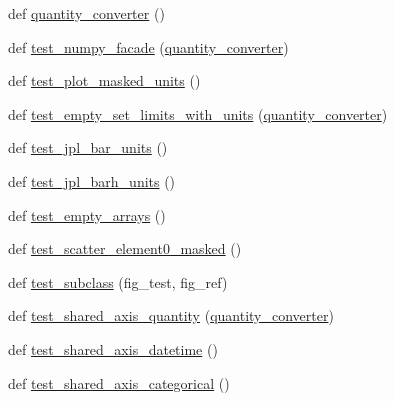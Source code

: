 \begin{DoxyCompactItemize}
\item 
def \hyperlink{namespacematplotlib_1_1tests_1_1test__units_a1844431c1fa8ffb8430bb34273ad40ff}{quantity\+\_\+converter} ()
\item 
def \hyperlink{namespacematplotlib_1_1tests_1_1test__units_ab53242bbae480923142ed100236415f3}{test\+\_\+numpy\+\_\+facade} (\hyperlink{namespacematplotlib_1_1tests_1_1test__units_a1844431c1fa8ffb8430bb34273ad40ff}{quantity\+\_\+converter})
\item 
def \hyperlink{namespacematplotlib_1_1tests_1_1test__units_a8c81888057096774c3852acd2827ab95}{test\+\_\+plot\+\_\+masked\+\_\+units} ()
\item 
def \hyperlink{namespacematplotlib_1_1tests_1_1test__units_a0cc3c51c2c34a3388a5bed4d284e31be}{test\+\_\+empty\+\_\+set\+\_\+limits\+\_\+with\+\_\+units} (\hyperlink{namespacematplotlib_1_1tests_1_1test__units_a1844431c1fa8ffb8430bb34273ad40ff}{quantity\+\_\+converter})
\item 
def \hyperlink{namespacematplotlib_1_1tests_1_1test__units_aa833f0d146edd79f9e2e421281ca8022}{test\+\_\+jpl\+\_\+bar\+\_\+units} ()
\item 
def \hyperlink{namespacematplotlib_1_1tests_1_1test__units_a7f25ff62286105f1fb3101c3a8e2105c}{test\+\_\+jpl\+\_\+barh\+\_\+units} ()
\item 
def \hyperlink{namespacematplotlib_1_1tests_1_1test__units_a1be59a39b7ef3714dd781790c78f57da}{test\+\_\+empty\+\_\+arrays} ()
\item 
def \hyperlink{namespacematplotlib_1_1tests_1_1test__units_a6db83e8e5aaeea232cf85a81c7082b2e}{test\+\_\+scatter\+\_\+element0\+\_\+masked} ()
\item 
def \hyperlink{namespacematplotlib_1_1tests_1_1test__units_a927b4f7a197e52706d1a7d33f5169a06}{test\+\_\+subclass} (fig\+\_\+test, fig\+\_\+ref)
\item 
def \hyperlink{namespacematplotlib_1_1tests_1_1test__units_a43112bda0bbc343fc25184ed1b864fc8}{test\+\_\+shared\+\_\+axis\+\_\+quantity} (\hyperlink{namespacematplotlib_1_1tests_1_1test__units_a1844431c1fa8ffb8430bb34273ad40ff}{quantity\+\_\+converter})
\item 
def \hyperlink{namespacematplotlib_1_1tests_1_1test__units_af1503bfa1d6c8013e8a2f71a3f596d64}{test\+\_\+shared\+\_\+axis\+\_\+datetime} ()
\item 
def \hyperlink{namespacematplotlib_1_1tests_1_1test__units_ae3410c446135afd0c431c7a8de535ca4}{test\+\_\+shared\+\_\+axis\+\_\+categorical} ()
\end{DoxyCompactItemize}


